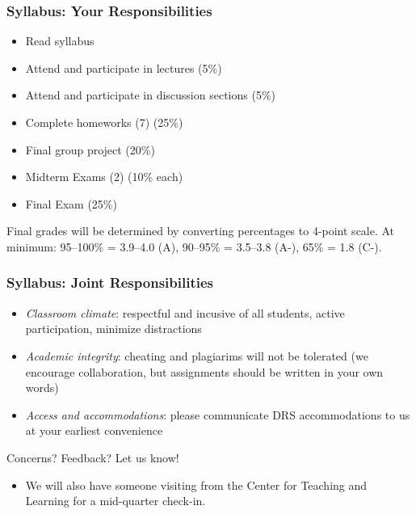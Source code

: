 \documentclass[12pt, 
hyperref={colorlinks=true, linkcolor=blue, urlcolor=cyan}]{beamer}
\begin{document}
\begin{frame}
\frametitle{Syllabus: Your Responsibilities}

\begin{itemize}
\item Read syllabus
\item Attend and participate in lectures \hfill (5\%) %
\item Attend and participate in discussion sections \hfill (5\%) %
\item Complete homeworks (7) \hfill (25\%)
\item Final group project \hfill (20\%) %
\item Midterm Exams (2) \hfill (10\% each)
\item Final Exam \hfill (25\%)
\end{itemize}

Final grades will be determined by converting percentages to 4-point scale. At minimum: 95--100\% = 3.9--4.0 (A), 90--95\% = 3.5--3.8 (A-), 65\% = 1.8 (C-).
\end{frame}

\begin{frame}
\frametitle{Syllabus: Joint Responsibilities}
\begin{itemize}
\item \textit{Classroom climate}: respectful and incusive of all students, active participation, minimize distractions %
\item \textit{Academic integrity}: cheating and plagiarims will not be tolerated (we encourage collaboration, but assignments should be written in your own words)
\item \textit{Access and accommodations}: please communicate DRS accommodations to us at your earliest convenience
\end{itemize}

Concerns? Feedback? Let us know!
\begin{itemize}
\item We will also have someone visiting from the Center for Teaching and Learning for a mid-quarter check-in.
\end{itemize}
\end{frame}
\end{document}
